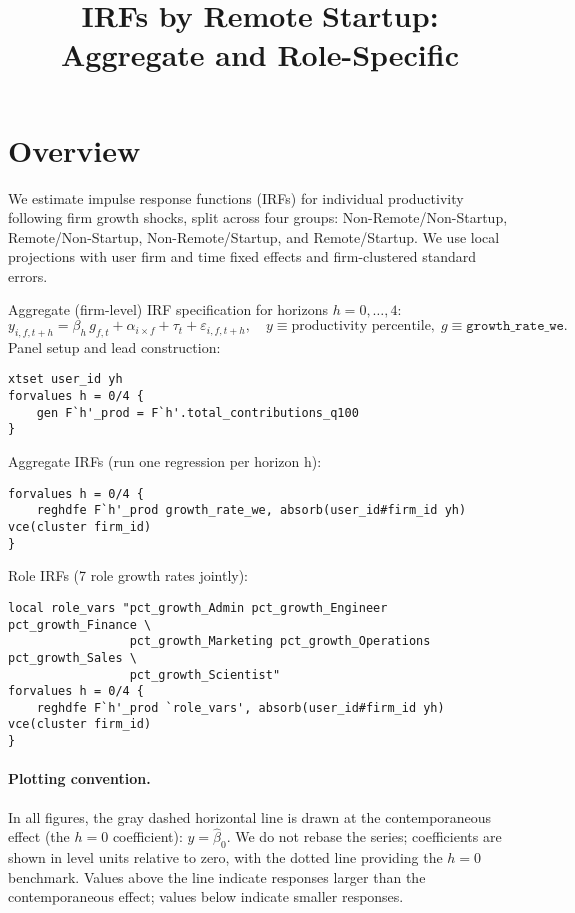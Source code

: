 \documentclass[11pt]{article}
\title{IRFs by Remote\,\texttimes\,Startup: Aggregate and Role-Specific}
\date{\vspace{-1.5em}}
\begin{document}
\maketitle

\section*{Overview}
We estimate impulse response functions (IRFs) for individual productivity following firm growth shocks, split across four groups: Non-Remote/Non-Startup, Remote/Non-Startup, Non-Remote/Startup, and Remote/Startup. We use local projections with user\,\texttimes\,firm and time fixed effects and firm-clustered standard errors.

\vspace{0.5em}
Aggregate (firm-level) IRF specification for horizons $h=0,\ldots,4$:
\begin{equation*}
  y_{i,f,t+h} = \beta_h\, g_{f,t} + \alpha_{i\times f} + \tau_t + \varepsilon_{i,f,t+h},\quad
  y \equiv \text{productivity percentile},\; g \equiv \texttt{growth\_rate\_we}.
\end{equation*}
Panel setup and lead construction:
\begin{verbatim}
xtset user_id yh
forvalues h = 0/4 {
    gen F`h'_prod = F`h'.total_contributions_q100
}
\end{verbatim}

Aggregate IRFs (run one regression per horizon h):
\begin{verbatim}
forvalues h = 0/4 {
    reghdfe F`h'_prod growth_rate_we, absorb(user_id#firm_id yh) vce(cluster firm_id)
}
\end{verbatim}

Role IRFs (7 role growth rates jointly):
\begin{verbatim}
local role_vars "pct_growth_Admin pct_growth_Engineer pct_growth_Finance \
                 pct_growth_Marketing pct_growth_Operations pct_growth_Sales \
                 pct_growth_Scientist"
forvalues h = 0/4 {
    reghdfe F`h'_prod `role_vars', absorb(user_id#firm_id yh) vce(cluster firm_id)
}
\end{verbatim}

\paragraph{Plotting convention.} In all figures, the gray dashed horizontal line is drawn at the contemporaneous effect (the $h{=}0$ coefficient): $y = \hat{\beta}_0$. We do not rebase the series; coefficients are shown in level units relative to zero, with the dotted line providing the $h{=}0$ benchmark. Values above the line indicate responses larger than the contemporaneous effect; values below indicate smaller responses.
\end{document}
